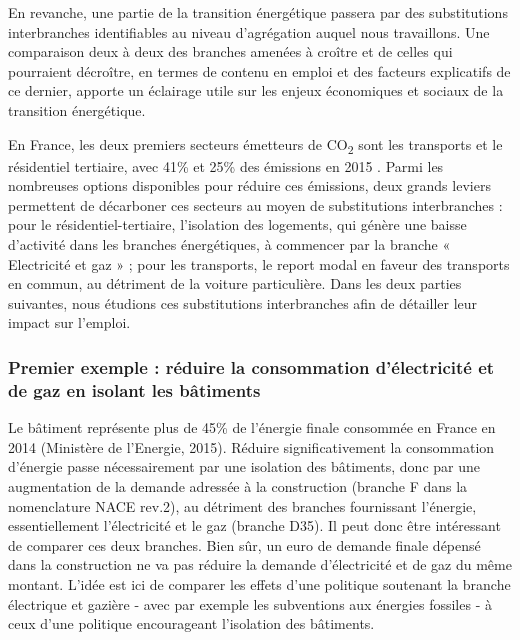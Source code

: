 En revanche, une partie de la transition énergétique passera par des substitutions interbranches identifiables au niveau d’agrégation auquel nous travaillons. Une comparaison deux à deux des branches amenées à croître et de celles qui pourraient décroître, en termes de contenu en emploi et des facteurs explicatifs de ce dernier, apporte un éclairage utile sur les enjeux économiques et sociaux de la transition énergétique. 

En France, les deux premiers secteurs émetteurs de CO\textsubscript{2} sont les transports et le résidentiel tertiaire, avec 41\% et 25\% des émissions en 2015 \citep{Dussud2016}. 
Parmi les nombreuses options disponibles pour réduire ces émissions, deux grands leviers permettent de décarboner ces secteurs au moyen de substitutions interbranches
: pour le résidentiel-tertiaire, l’isolation des logements, qui génère une baisse d’activité dans les branches énergétiques, à commencer par la branche « Electricité et gaz » ; pour les transports, le report modal en faveur des transports en commun, au détriment de la voiture particulière.
Dans les deux parties suivantes, nous étudions ces substitutions interbranches afin de détailler leur impact sur l'emploi. 

\subsubsection{Premier exemple : réduire la consommation d'électricité et de gaz en isolant les bâtiments}

Le bâtiment représente plus de 45\% de l’énergie finale consommée en France en 2014 (Ministère de l’Energie, 2015). Réduire significativement la consommation d’énergie passe nécessairement par une isolation des bâtiments, donc par une augmentation de la demande adressée à la construction (branche F dans la nomenclature NACE rev.2), au détriment des branches fournissant l’énergie, essentiellement l’électricité et le gaz (branche D35). Il peut donc être intéressant de comparer ces deux branches. Bien sûr, un euro de demande finale dépensé dans la construction ne va pas réduire la demande d'électricité et de gaz du même montant. L'idée est ici de comparer les effets d’une politique soutenant la branche électrique et gazière - avec par exemple les subventions aux énergies fossiles \citep{OCDE2015} - à ceux d’une politique encourageant l'isolation des bâtiments. 

